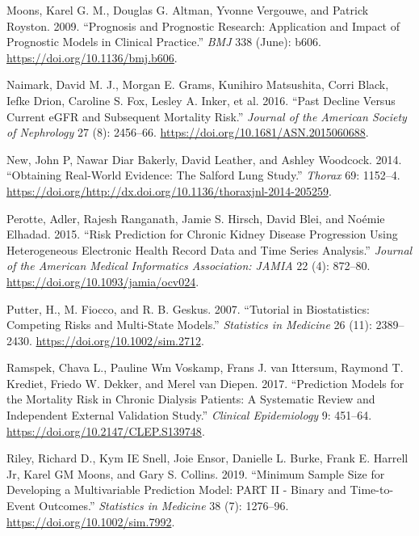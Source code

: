 \documentclass[
]{article}
\newlength{\cslhangindent}
\newenvironment{cslreferences}%
  {\setlength{\parindent}{0pt}%
  \everypar{\setlength{\hangindent}{\cslhangindent}}\ignorespaces}%
  {\par}
\begin{document}
\begin{cslreferences}
\leavevmode\hypertarget{ref-moons_prognosis_2009-1}{}%
Moons, Karel G. M., Douglas G. Altman, Yvonne Vergouwe, and Patrick Royston. 2009. ``Prognosis and Prognostic Research: Application and Impact of Prognostic Models in Clinical Practice.'' \emph{BMJ} 338 (June): b606. \url{https://doi.org/10.1136/bmj.b606}.

\leavevmode\hypertarget{ref-naimark_past_2016}{}%
Naimark, David M. J., Morgan E. Grams, Kunihiro Matsushita, Corri Black, Iefke Drion, Caroline S. Fox, Lesley A. Inker, et al. 2016. ``Past Decline Versus Current eGFR and Subsequent Mortality Risk.'' \emph{Journal of the American Society of Nephrology} 27 (8): 2456--66. \url{https://doi.org/10.1681/ASN.2015060688}.

\leavevmode\hypertarget{ref-new_obtaining_2014}{}%
New, John P, Nawar Diar Bakerly, David Leather, and Ashley Woodcock. 2014. ``Obtaining Real-World Evidence: The Salford Lung Study.'' \emph{Thorax} 69: 1152--4. \url{https://doi.org/http://dx.doi.org/10.1136/thoraxjnl-2014-205259}.

\leavevmode\hypertarget{ref-perotte_risk_2015}{}%
Perotte, Adler, Rajesh Ranganath, Jamie S. Hirsch, David Blei, and Noémie Elhadad. 2015. ``Risk Prediction for Chronic Kidney Disease Progression Using Heterogeneous Electronic Health Record Data and Time Series Analysis.'' \emph{Journal of the American Medical Informatics Association: JAMIA} 22 (4): 872--80. \url{https://doi.org/10.1093/jamia/ocv024}.

\leavevmode\hypertarget{ref-putter_tutorial_2007}{}%
Putter, H., M. Fiocco, and R. B. Geskus. 2007. ``Tutorial in Biostatistics: Competing Risks and Multi-State Models.'' \emph{Statistics in Medicine} 26 (11): 2389--2430. \url{https://doi.org/10.1002/sim.2712}.

\leavevmode\hypertarget{ref-ramspek_prediction_2017}{}%
Ramspek, Chava L., Pauline Wm Voskamp, Frans J. van Ittersum, Raymond T. Krediet, Friedo W. Dekker, and Merel van Diepen. 2017. ``Prediction Models for the Mortality Risk in Chronic Dialysis Patients: A Systematic Review and Independent External Validation Study.'' \emph{Clinical Epidemiology} 9: 451--64. \url{https://doi.org/10.2147/CLEP.S139748}.

\leavevmode\hypertarget{ref-riley_minimum_2019}{}%
Riley, Richard D., Kym IE Snell, Joie Ensor, Danielle L. Burke, Frank E. Harrell Jr, Karel GM Moons, and Gary S. Collins. 2019. ``Minimum Sample Size for Developing a Multivariable Prediction Model: PART II - Binary and Time-to-Event Outcomes.'' \emph{Statistics in Medicine} 38 (7): 1276--96. \url{https://doi.org/10.1002/sim.7992}.


\end{cslreferences}
\end{document}
